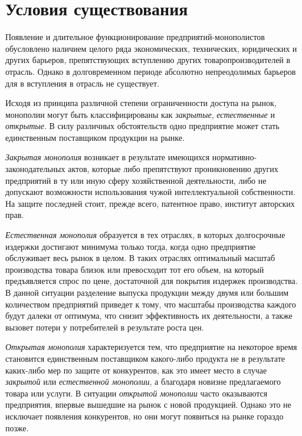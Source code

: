 \documentclass[12pt]{article}
\begin{document}
    \newpage

    \section*{Условия существования}

    Появление и длительное функционирование предприятий-монополистов обусловлено наличием целого ряда экономических, технических, юридических и других барьеров, препятствующих вступлению других товаропроизводителей в отрасль. Однако в долговременном периоде абсолютно непреодолимых барьеров для в вступления в отрасль не существует.

    Исходя из принципа различной степени ограниченности доступа на рынок, монополии могут быть классифицированы как \emph{закрытые}, \emph{естественные} и \emph{открытые}. В силу различных обстоятельств одно предприятие может стать единственным поставщиком продукции на рынке.

    \emph{Закрытая монополия} возникает в результате имеющихся нормативно-законодательных актов, которые либо препятствуют проникновению других предприятий в ту или иную сферу хозяйственной деятельности, либо не допускают возможности использования чужой интеллектуальной собственности. На защите последней стоит, прежде всего, патентное право, институт авторских прав.

    \emph{Естественная монополия} образуется в тех отраслях, в которых долгосрочные издержки достигают минимума только тогда, когда одно предприятие обслуживает весь рынок в целом. В таких отраслях оптимальный масштаб производства товара близок или превосходит тот его объем, на который предъявляется спрос по цене, достаточной для покрытия издержек производства. В данной ситуации разделение выпуска продукции между двумя или большим количеством предприятий приведет к тому, что масштабы производства каждого будут далеки от оптимума, что снизит эффективность их деятельности, а также вызовет потери у потребителей в результате роста цен.

    \emph{Открытая монополия} характеризуется тем, что предприятие на некоторое время становится единственным поставщиком какого-либо продукта не в результате каких-либо мер по защите от конкурентов, как это имеет место в случае \emph{закрытой} или \emph{естественной монополии}, а благодаря новизне предлагаемого товара или услуги. В ситуации \emph{открытой монополии} часто оказываются предприятия, впервые вышедшие на рынок с новой продукцией. Однако это не исключает появления конкурентов, но они могут появиться на рынке гораздо позже.
\end{document}
